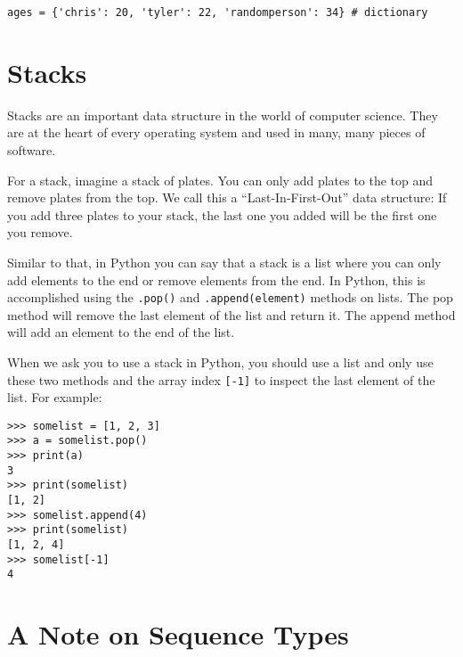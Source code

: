 \documentclass[11pt]{cselabheader}
\begin{document}
\begin{lstlisting}[style=ipython]
ages = {'chris': 20, 'tyler': 22, 'randomperson': 34} # dictionary
\end{lstlisting}

\pagebreak
\section{Stacks}

Stacks are an important data structure in the world of computer
science. They are at the heart of every operating system and used in many, many
pieces of software.

For a stack, imagine a stack of plates. You can only add plates to the top and
remove plates from the top. We call this a ``Last-In-First-Out'' data structure:
If you add three plates to your stack, the last one you added will be the first
one you remove.

Similar to that, in Python you can say that a stack
is a list where you can only add elements to the end or remove elements from the
end. In Python, this is accomplished using the
\lstinline!.pop()! and \lstinline!.append(element)! methods on lists. The pop
method will remove the last element of the list and return it. The append method
will add an element to the end of the list.

When we ask you to use a stack in Python, you should use a list and only use
these two methods and the array index \lstinline![-1]! to inspect the last
element of the list. For example:

\begin{lstlisting}[style=ipython]
>>> somelist = [1, 2, 3]
>>> a = somelist.pop()
>>> print(a)
3
>>> print(somelist)
[1, 2]
>>> somelist.append(4)
>>> print(somelist)
[1, 2, 4]
>>> somelist[-1]
4
\end{lstlisting}

\pagebreak

\section{A Note on Sequence Types}


\pagebreak

\end{document}
